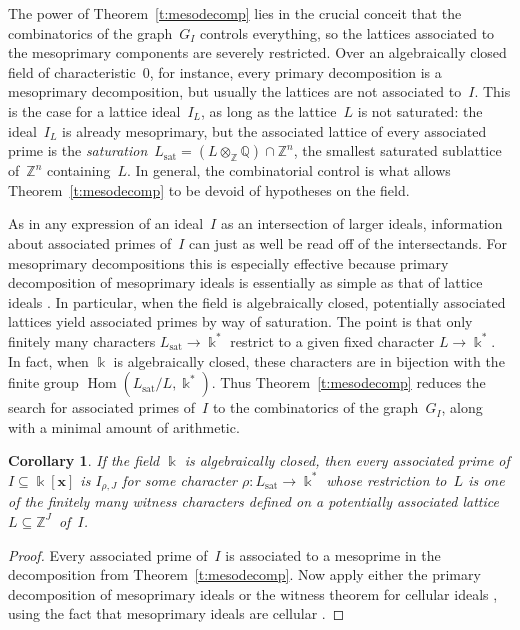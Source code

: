 \documentclass[12pt]{amsart}
\numberwithin{equation}{section}
\newtheorem{cor}[thm]{Corollary}
\theoremstyle{definition}
\begin{document}
The power of Theorem~\ref{t:mesodecomp} lies in the crucial conceit
that the combinatorics of the graph~$G_I$ controls everything, so the
lattices associated to the mesoprimary components are severely
restricted.  Over an algebraically closed field of characteristic~$0$,
for instance, every primary decomposition is a mesoprimary
decomposition, but usually the lattices are not associated to~$I$.
This is the case for a lattice ideal~$I_L$, as long as the lattice~$L$
is not saturated: the ideal~$I_L$ is already mesoprimary, but the
associated lattice of every associated prime is the
\emph{saturation}~$L_{\mathrm{sat}} = (L \otimes_{\mathbb{Z}} {\mathbb{Q}}) \cap {\mathbb{Z}}^n$, the
smallest saturated sublattice of~${\mathbb{Z}}^n$ containing~$L$.  In general,
the combinatorial control is what allows Theorem~\ref{t:mesodecomp} to
be devoid of hypotheses on the field.

As in any expression of an ideal~$I$ as an intersection of larger
ideals, information about associated primes of~$I$ can just as well be
read off of the intersectands.  For mesoprimary decompositions this is
especially effective because primary decomposition of mesoprimary
ideals
\cite{mesoprimary} is essentially as simple as that of lattice ideals
\cite[Corollary~2.5]{binomialIdeals}.  In particular, when the field
is algebraically closed, potentially associated lattices yield
associated primes by way of saturation.  The point is that only
finitely many characters $L_{\mathrm{sat}} \to {\Bbbk}^*$ restrict to a given fixed
character $L \to {\Bbbk}^*$.  In fact, when ${\Bbbk}$ is algebraically closed,
these characters are in bijection with the finite group
$\operatorname{Hom}(L_{\mathrm{sat}}/L,{\Bbbk}^*)$.  Thus Theorem~\ref{t:mesodecomp} reduces the
search for associated primes of~$I$ to the combinatorics of the
graph~$G_I$, along with a minimal amount of arithmetic.

\begin{cor}\label{c:mesoprime}
If the field\/ ${\Bbbk}$ is algebraically closed, then every associated
prime of\/ $I \subseteq {\Bbbk}[{\mathbf{x}}]$ is $I_{\rho,J}$ for some character
$\rho: L_{\mathrm{sat}} \to {\Bbbk}^*$ whose restriction to~$L$ is one of the
finitely many witness characters defined on a potentially associated
lattice $L \subseteq {\mathbb{Z}}^J\!$~of\/~$I$.
\end{cor}
\begin{proof}
Every associated prime of~$I$ is associated to a mesoprime in the
decomposition from Theorem~\ref{t:mesodecomp}.  Now apply either the
primary decomposition of mesoprimary ideals
\cite{mesoprimary} or the witness theorem for cellular ideals
\cite[Theorem~8.1]{binomialIdeals}, using the fact that mesoprimary
ideals are cellular
\cite{mesoprimary}.
\end{proof}
\end{document}
